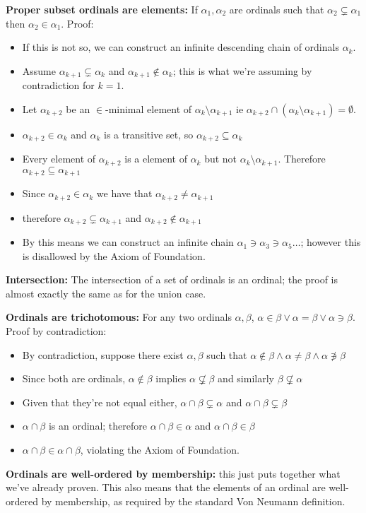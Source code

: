 \documentclass{article}
\begin{document}
\textbf{Proper subset ordinals are elements:} If $\alpha_1, \alpha_2$ are ordinals such that $\alpha_2 \subsetneq \alpha_1$ then $\alpha_2 \in \alpha_1$. Proof: 
\begin{itemize}
\item If this is not so, we can construct an infinite descending chain of ordinals $\alpha_k$.
\item Assume $\alpha_{k+1} \subsetneq \alpha_k$ and $\alpha_{k+1} \not\in \alpha_k$; this is what we're assuming by contradiction for $k=1$.
\item Let $\alpha_{k+2}$ be an $\in$-minimal element of $\alpha_k \setminus \alpha_{k+1}$ ie $\alpha_{k+2} \cap (\alpha_k \setminus \alpha_{k+1}) = \emptyset$.
\item $\alpha_{k+2} \in \alpha_k$ and $\alpha_k$ is a transitive set, so $\alpha_{k+2} \subseteq \alpha_k$ 
\item Every element of $\alpha_{k+2}$ is a element of $\alpha_k$ but not $\alpha_k \setminus \alpha_{k+1}$. Therefore $\alpha_{k+2} \subseteq \alpha_{k+1}$
\item Since $\alpha_{k+2} \in \alpha_k$ we have that $\alpha_{k+2} \neq \alpha_{k+1}$
\item therefore $\alpha_{k+2} \subsetneq \alpha_{k+1}$ and $\alpha_{k+2} \not\in \alpha_{k+1}$
\item By this means we can construct an infinite chain $\alpha_1 \ni \alpha_3 \ni \alpha_5 \ldots$; however this is disallowed by the Axiom of Foundation.
\end{itemize}

\textbf{Intersection:} The intersection of a set of ordinals is an ordinal; the proof is almost exactly the same as for the union case.

\textbf{Ordinals are trichotomous:} For any two ordinals $\alpha, \beta$, $\alpha \in \beta \vee \alpha = \beta \vee \alpha \ni \beta$. Proof by contradiction: 
\begin{itemize}
\item By contradiction, suppose there exist  $\alpha, \beta$ such that $\alpha \not\in \beta \wedge \alpha \neq \beta \wedge \alpha \not\ni \beta$
\item Since both are ordinals, $\alpha \not\in \beta$ implies $\alpha \not\subsetneq \beta$ and similarly $\beta \not\subsetneq \alpha$
\item Given that they're not equal either, $\alpha \cap \beta \subsetneq \alpha$ and $\alpha \cap \beta \subsetneq \beta$
\item $\alpha \cap \beta$ is an ordinal; therefore $\alpha \cap \beta \in \alpha$ and $\alpha \cap \beta \in \beta$
\item $\alpha \cap \beta \in \alpha \cap \beta$, violating the Axiom of Foundation.
\end{itemize}

\textbf{Ordinals are well-ordered by membership:} this just puts together what we've already proven. This also means that the elements of an ordinal are well-ordered by membership, as required by the standard Von Neumann definition.
\end{document}
